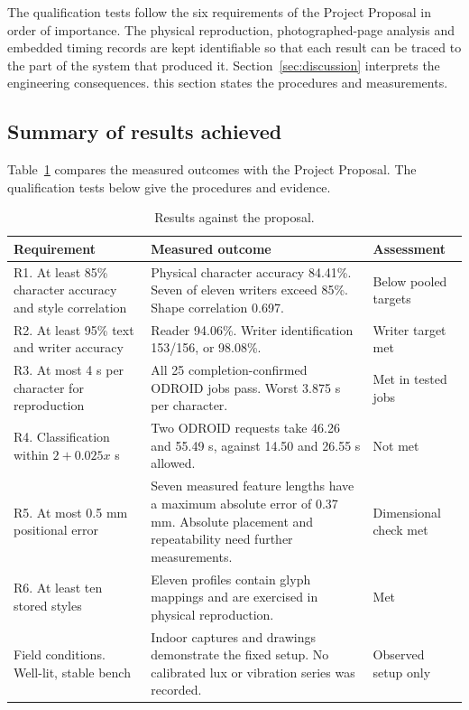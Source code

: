 \label{sec:results}
The qualification tests follow the six requirements of the Project Proposal in order of importance. The physical reproduction, photographed-page analysis and embedded timing records are kept identifiable so that each result can be traced to the part of the system that produced it. Section~\ref{sec:discussion} interprets the engineering consequences. this section states the procedures and measurements.

\subsection{Summary of results achieved}
\label{sec:res-summary}
Table~\ref{tab:res-summary} compares the measured outcomes with the Project Proposal. The qualification tests below give the procedures and evidence.
\begin{table}[!htbp]\centering\small
\setlength{\tabcolsep}{5pt}\begin{tabular}{p{.27\linewidth}p{.54\linewidth}p{.12\linewidth}}\toprule
Requirement & Measured outcome & Assessment\\\midrule
R1. At least 85\% character accuracy and style correlation & Physical character accuracy 84.41\%. Seven of eleven writers exceed 85\%. Shape correlation 0.697. & Below pooled targets\\[4pt]
R2. At least 95\% text and writer accuracy & Reader 94.06\%. Writer identification 153/156, or 98.08\%. & Writer target met\\[4pt]
R3. At most 4 s per character for reproduction & All 25 completion-confirmed ODROID jobs pass. Worst 3.875 s per character. & Met in tested jobs\\[4pt]
R4. Classification within $2+0.025x$ s & Two ODROID requests take 46.26 and 55.49 s, against 14.50 and 26.55 s allowed. & Not met\\[4pt]
R5. At most 0.5 mm positional error & Seven measured feature lengths have a maximum absolute error of 0.37 mm. Absolute placement and repeatability need further measurements. & Dimensional check met\\[4pt]
R6. At least ten stored styles & Eleven profiles contain glyph mappings and are exercised in physical reproduction. & Met\\[4pt]
Field conditions. Well-lit, stable bench & Indoor captures and drawings demonstrate the fixed setup. No calibrated lux or vibration series was recorded. & Observed setup only\\\bottomrule
\end{tabular}
\caption{Results against the proposal.}\label{tab:res-summary}
\end{table}
\FloatBarrier

